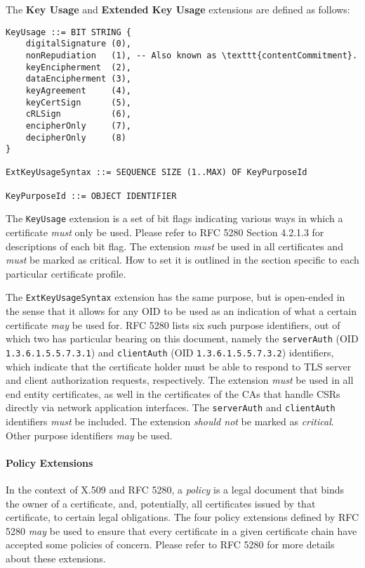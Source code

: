 The \textbf{Key Usage} and \textbf{Extended Key Usage} extensions are defined as follows:

\begin{verbatim}
KeyUsage ::= BIT STRING {
    digitalSignature (0),
    nonRepudiation   (1), -- Also known as \texttt{contentCommitment}.
    keyEncipherment  (2),
    dataEncipherment (3),
    keyAgreement     (4),
    keyCertSign      (5),
    cRLSign          (6),
    encipherOnly     (7),
    decipherOnly     (8)
}

ExtKeyUsageSyntax ::= SEQUENCE SIZE (1..MAX) OF KeyPurposeId

KeyPurposeId ::= OBJECT IDENTIFIER
\end{verbatim}

The \texttt{KeyUsage} extension is a set of bit flags indicating various ways in which a certificate \textit{must} only be used.
Please refer to RFC 5280 Section 4.2.1.3 for descriptions of each bit flag.
The extension \textit{must} be used in all certificates and \textit{must} be marked as critical.
How to set it is outlined in the section specific to each particular certificate profile.

The \texttt{ExtKeyUsageSyntax} extension has the same purpose, but is open-ended in the sense that it allows for any OID to be used as an indication of what a certain certificate \textit{may} be used for.
RFC 5280 lists six such purpose identifiers, out of which two has particular bearing on this document, namely the \texttt{serverAuth} (OID \texttt{1.3.6.1.5.5.7.3.1}) and \texttt{clientAuth} (OID \texttt{1.3.6.1.5.5.7.3.2}) identifiers, which indicate that the certificate holder must be able to respond to TLS server and client authorization requests, respectively.
The extension \textit{must} be used in all end entity certificates, as well in the certificates of the CAs that handle CSRs directly via network application interfaces.
The \texttt{serverAuth} and \texttt{clientAuth} identifiers \textit{must} be included.
The extension \textit{should not} be marked as \textit{critical}.
Other purpose identifiers \textit{may} be used.

\paragraph{Policy Extensions}

In the context of X.509 and RFC 5280, a \textit{policy} is a legal document that binds the owner of a certificate, and, potentially, all certificates issued by that certificate, to certain legal obligations.
The four policy extensions defined by RFC 5280 \textit{may} be used to ensure that every certificate in a given certificate chain have accepted some policies of concern.
Please refer to RFC 5280 for more details about these extensions.

